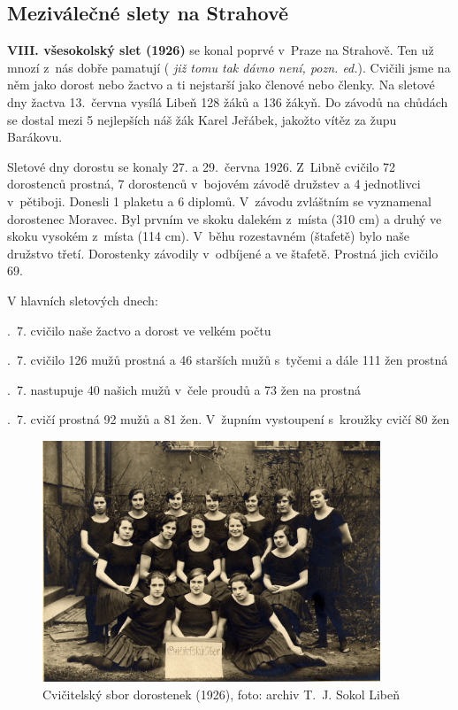 \documentclass[a5paper, 11pt, twoside]{article}
\newcommand{\pozned}[1]{%
\textit{#1}}
\begin{document}
\subsection{Meziválečné slety na Strahově}

\textbf{VIII. všesokolský slet (1926)} se konal poprvé v~Praze na
Strahově. Ten už mnozí z~nás dobře pamatují (\pozned{již tomu tak dávno
není, pozn. ed.}). Cvičili jsme na něm jako dorost nebo žactvo a ti
nejstarší jako členové nebo členky. Na sletové dny žactva 13.~června
vysílá Libeň 128 žáků a 136 žákyň. Do závodů na chůdách se dostal mezi 5
nejlepších náš žák Karel Jeřábek, jakožto vítěz za župu Barákovu.

Sletové dny dorostu se konaly 27. a 29.~června 1926. Z~Libně cvičilo 72
dorostenců prostná, 7 dorostenců v~bojovém závodě družstev a 4
jednotlivci v~pětiboji. Donesli 1 plaketu a 6 diplomů. V~závodu
zvláštním se vyznamenal dorostenec Moravec. Byl prvním ve skoku dalekém
z~místa (310 cm) a druhý ve skoku vysokém z~místa (114 cm). V~běhu
rozestavném (štafetě) bylo naše družstvo třetí. Dorostenky závodily
v~odbíjené a ve štafetě. Prostná jich cvičilo 69.

\smallskip
\noindent V hlavních sletových dnech:

.~7. cvičilo naše žactvo a dorost ve velkém počtu

.~7. cvičilo 126 mužů prostná a 46 starších mužů s~tyčemi a dále 111
žen prostná

.~7. nastupuje 40 našich mužů v~čele proudů a 73 žen na prostná

.~7. cvičí prostná 92 mužů a 81 žen. V~župním vystoupení s~kroužky
cvičí 80 žen
\medskip

\begin{figure}[h!]
  \centering 
  \includegraphics[width=0.9\textwidth]{img/27_dorostenky.jpg}
  \caption*{Cvičitelský sbor dorostenek (1926), foto: archiv T.~J. Sokol
  Libeň}
\end{figure}
\end{document}
